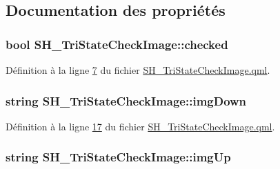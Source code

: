 \subsection{Documentation des propriétés}
\hypertarget{classSH__TriStateCheckImage_af51c5a98710ecd059fd02bd955443d4c}{
\subsubsection[{checked}]{\setlength{\rightskip}{0pt plus 5cm}bool S\-H\-\_\-\-Tri\-State\-Check\-Image\-::checked}}\label{classSH__TriStateCheckImage_af51c5a98710ecd059fd02bd955443d4c}


Définition à la ligne \hyperlink{SH__TriStateCheckImage_8qml_source_l00007}{7} du fichier \hyperlink{SH__TriStateCheckImage_8qml_source}{S\-H\-\_\-\-Tri\-State\-Check\-Image.\-qml}.

\hypertarget{classSH__TriStateCheckImage_a1dd7b1fbd15c10d427d72a9bd0d1e4d5}{
\subsubsection[{img\-Down}]{\setlength{\rightskip}{0pt plus 5cm}string S\-H\-\_\-\-Tri\-State\-Check\-Image\-::img\-Down}}\label{classSH__TriStateCheckImage_a1dd7b1fbd15c10d427d72a9bd0d1e4d5}


Définition à la ligne \hyperlink{SH__TriStateCheckImage_8qml_source_l00017}{17} du fichier \hyperlink{SH__TriStateCheckImage_8qml_source}{S\-H\-\_\-\-Tri\-State\-Check\-Image.\-qml}.

\hypertarget{classSH__TriStateCheckImage_a94f6100793509e72d00079b4566a74f8}{
\subsubsection[{img\-Up}]{\setlength{\rightskip}{0pt plus 5cm}string S\-H\-\_\-\-Tri\-State\-Check\-Image\-::img\-Up}}\label{classSH__TriStateCheckImage_a94f6100793509e72d00079b4566a74f8}


